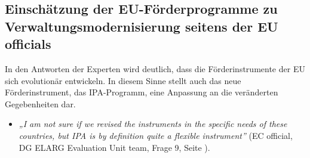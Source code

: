 \subsection{Einschätzung der EU-Förderprogramme zu Verwaltungsmodernisierung seitens der EU officials }
In den Antworten der Experten wird deutlich, dass die Förderinstrumente der EU sich evolutionär entwickeln. In diesem Sinne stellt auch das neue Förderinstrument, das IPA-Programm, eine Anpassung an die veränderten Gegebenheiten dar.
\begin{itemize}[label={}]
\item \textit{„I am not sure if we revised the instruments in the specific needs of these countries, but IPA is by definition quite a flexible instrument”} (EC official, DG ELARG Evaluation Unit team, Frage 9, Seite \pageref{sec:technical}).
\end{itemize}

